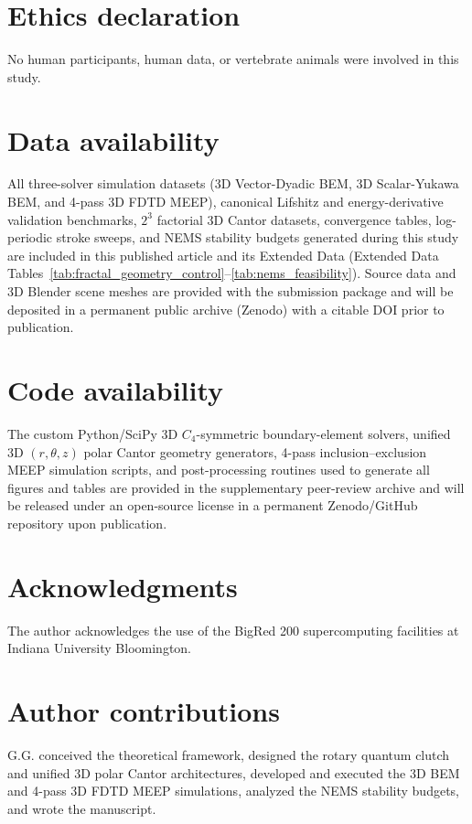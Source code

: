 \documentclass[pdflatex,sn-nature]{sn-jnl}
\begin{document}
\section*{Ethics declaration}
No human participants, human data, or vertebrate animals were involved in this study.

\section*{Data availability}
All three-solver simulation datasets (3D Vector-Dyadic BEM, 3D Scalar-Yukawa BEM, and 4-pass 3D FDTD MEEP), canonical Lifshitz and energy-derivative validation benchmarks, $2^3$ factorial 3D Cantor datasets, convergence tables, log-periodic stroke sweeps, and NEMS stability budgets generated during this study are included in this published article and its Extended Data (Extended Data Tables~\ref{tab:fractal_geometry_control}--\ref{tab:nems_feasibility}). Source data and 3D Blender scene meshes are provided with the submission package and will be deposited in a permanent public archive (Zenodo) with a citable DOI prior to publication.

\section*{Code availability}
The custom Python/SciPy 3D $C_4$-symmetric boundary-element solvers, unified 3D $(r,\theta,z)$ polar Cantor geometry generators, 4-pass inclusion--exclusion MEEP simulation scripts, and post-processing routines used to generate all figures and tables are provided in the supplementary peer-review archive and will be released under an open-source license in a permanent Zenodo/GitHub repository upon publication.

\section*{Acknowledgments}
The author acknowledges the use of the BigRed 200 supercomputing facilities at Indiana University Bloomington.

\section*{Author contributions}
G.G. conceived the theoretical framework, designed the rotary quantum clutch and unified 3D polar Cantor architectures, developed and executed the 3D BEM and 4-pass 3D FDTD MEEP simulations, analyzed the NEMS stability budgets, and wrote the manuscript.
\end{document}
